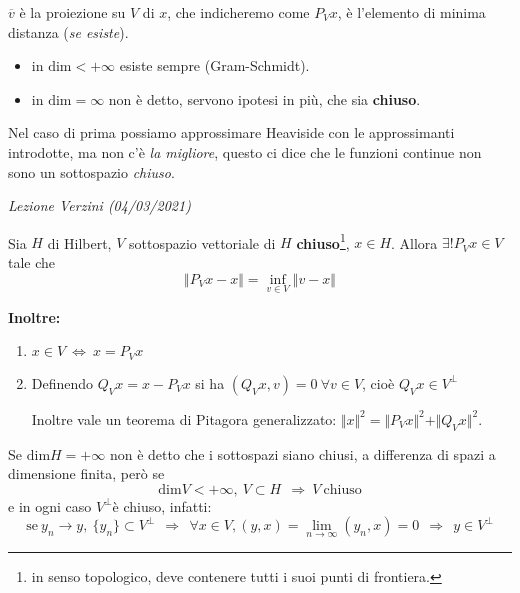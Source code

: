 \documentclass[10pt,a4paper,twoside,openright]{book}
\newcounter{conteggioV}
\newcommand{\LezioneV}[1]{
	\stepcounter{conteggioV}
	\textit{Lezione Verzini \arabic{conteggioV} (#1)}
	}
\begin{document}
$\displaystyle \overline{v}$ è la proiezione su $V$ di $x$, che indicheremo come $P_{V} x$, è l'elemento di minima distanza (\textit{se esiste}).
\begin{itemize}
    \item in $\mathrm{dim} < +\infty $ esiste sempre (Gram-Schmidt).
    \item in $\mathrm{dim} =\infty $ non è detto, servono ipotesi in più, che sia \textbf{chiuso}.
\end{itemize}

Nel caso di prima possiamo approssimare Heaviside con le approssimanti introdotte, ma non c'è \textit{la migliore}, questo ci dice che le funzioni continue non sono un sottospazio \textit{chiuso}.

\LezioneV{04/03/2021}
\begin{theorem}
     Sia $H$ di Hilbert, $V$ sottospazio vettoriale di $H$ \textbf{chiuso}\footnote{in senso topologico, deve contenere tutti i suoi punti di frontiera.}, $x\in H$. Allora $\exists !P_{V} x\in V$ tale che
    \begin{equation*}
        \Vert P_{V} x-x\Vert =\inf_{v\in V}\Vert v-x\Vert
    \end{equation*}

    \textbf{Inoltre:}
    \begin{enumerate}
        \item $\displaystyle x\in V\ \Leftrightarrow \ x=P_{V} x$
        \item Definendo $\displaystyle Q_{V} x=x-P_{V} x$ si ha $(Q_{V} x,v) =0\ \forall v\in V$, cioè $\displaystyle Q_{V} x\in V^{\bot }$

              Inoltre vale un teorema di Pitagora generalizzato: $\Vert x\Vert ^{2} =\Vert P_{V} x\Vert ^{2} +\Vert Q_{V} x\Vert ^{2}$.
    \end{enumerate}
\end{theorem}
\begin{nb}
    Se $\displaystyle \mathrm{dim} H\mathrm{=+\infty }$ non è detto che i sottospazi siano chiusi, a differenza di spazi a dimensione finita, però se
    \begin{equation*}
        \mathrm{dim} V< +\infty,\ V\subset H\ \ \Rightarrow \ V\ \text{chiuso}
    \end{equation*}
    e in ogni caso $\displaystyle V^{\bot }$è chiuso, infatti:
    \begin{equation*}
        \text{se} \ y_{n}\rightarrow y,\ \{y_{n}\} \subset V^{\bot } \ \ \Rightarrow \ \ \forall x\in V,(y,x) =\lim _{n\rightarrow \infty }(y_{n} ,x) =0\ \ \Rightarrow \ \ y\in V^{\bot }
    \end{equation*}
\end{nb}
\end{document}
